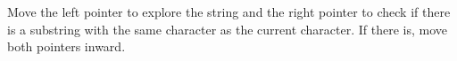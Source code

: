 \documentclass[preview]{standalone}
\begin{document}
Move the left pointer to explore the string and the right pointer to check if there is a substring with the same character as the current character. If there is, move both pointers inward.\\
\end{document}

